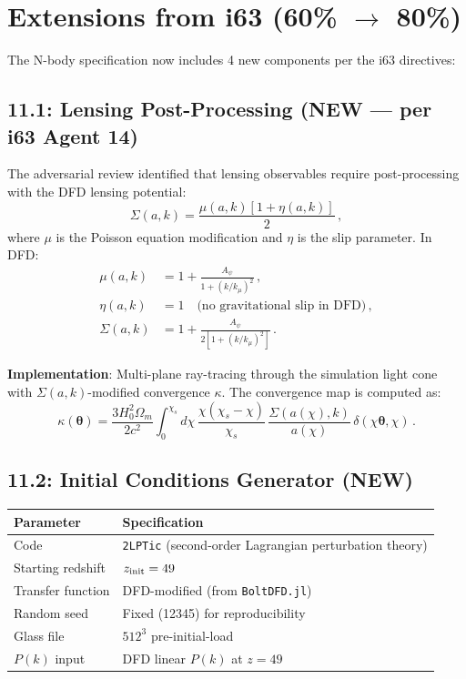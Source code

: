 \documentclass[11pt,a4paper]{article}
\begin{document}
\section{Extensions from i63 (60\% $\to$ 80\%)}

The N-body specification now includes 4 new components per the i63 directives:

\subsection{11.1: Lensing Post-Processing (NEW --- per i63 Agent 14)}

The adversarial review identified that lensing observables require post-processing with the DFD lensing potential:
\begin{equation}
\Sigma(a,k) = \frac{\mu(a,k)[1 + \eta(a,k)]}{2}\,,
\end{equation}
where $\mu$ is the Poisson equation modification and $\eta$ is the slip parameter. In DFD:
\begin{align}
\mu(a,k) &= 1 + \frac{A_\psi}{1 + (k/k_\mu)^2}\,,\\
\eta(a,k) &= 1\quad\text{(no gravitational slip in DFD)}\,,\\
\Sigma(a,k) &= 1 + \frac{A_\psi}{2[1 + (k/k_\mu)^2]}\,.
\end{align}

\textbf{Implementation}: Multi-plane ray-tracing through the simulation light cone with $\Sigma(a,k)$-modified convergence $\kappa$. The convergence map is computed as:
\begin{equation}
\kappa(\boldsymbol{\theta}) = \frac{3H_0^2\Omega_m}{2c^2}\int_0^{\chi_s}\!\!d\chi\,\frac{\chi(\chi_s - \chi)}{\chi_s}\,\frac{\Sigma(a(\chi), k)}{a(\chi)}\,\delta(\chi\boldsymbol{\theta}, \chi)\,.
\end{equation}

\subsection{11.2: Initial Conditions Generator (NEW)}

\begin{center}
\begin{tabular}{ll}
\toprule
\textbf{Parameter} & \textbf{Specification} \\
\midrule
Code & \texttt{2LPTic} (second-order Lagrangian perturbation theory) \\
Starting redshift & $z_{\rm init} = 49$ \\
Transfer function & DFD-modified (from \texttt{BoltDFD.jl}) \\
Random seed & Fixed (12345) for reproducibility \\
Glass file & $512^3$ pre-initial-load \\
$P(k)$ input & DFD linear $P(k)$ at $z = 49$ \\
\bottomrule
\end{tabular}
\end{center}
\end{document}
